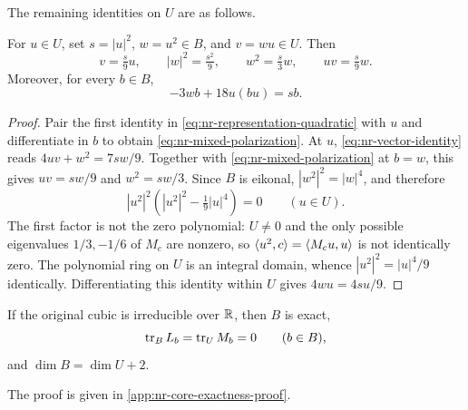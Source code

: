 The remaining identities on $U$ are as follows.

\begin{lemma}\label{lem:nr-U-cubic}
For $u\in U$, set $s=|u|^2$, $w=u^2\in B$, and $v=wu\in U$.
Then
\begin{equation}\label{eq:nr-U-identities}
 v=\tfrac s9u,\qquad |w|^2=\tfrac{s^2}9,\qquad
 w^2=\tfrac s3w,\qquad uv=\tfrac s9w.
\end{equation}
Moreover, for every $b\in B$,
\begin{equation}\label{eq:nr-mixed-polarization}
 -3wb+18u(bu)=sb.
\end{equation}
\end{lemma}
\begin{proof}
Pair the first identity in \eqref{eq:nr-representation-quadratic}
with $u$ and differentiate in $b$ to obtain
\eqref{eq:nr-mixed-polarization}.
At $u$, \eqref{eq:nr-vector-identity} reads
$4uv+w^2=7sw/9$.
Together with \eqref{eq:nr-mixed-polarization} at $b=w$, this gives
$uv=sw/9$ and $w^2=sw/3$.
Since $B$ is eikonal, $|w^2|^2=|w|^4$, and therefore
\[
 |u^2|^2\left(|u^2|^2-\tfrac19|u|^4\right)=0
 \qquad(u\in U).
\]
The first factor is not the zero polynomial: $U\ne0$ and the
only possible eigenvalues $1/3,-1/6$ of $M_c$ are nonzero, so
$\langle u^2,c\rangle=\langle M_cu,u\rangle$ is not identically zero.
The polynomial ring on $U$ is an integral domain, whence
$|u^2|^2=|u|^4/9$ identically.
Differentiating this identity within $U$ gives $4wu=4su/9$.
\end{proof}

\begin{proposition}\label{prop:nr-core-exactness}
If the original cubic is irreducible over $\mathbb R$, then $B$ is exact,
\[
 \operatorname{tr}_B L_b=\operatorname{tr}_U M_b=0\qquad(b\in B),
\]
and $\dim B=\dim U+2$.
\end{proposition}
The proof is given in \cref{app:nr-core-exactness-proof}.
